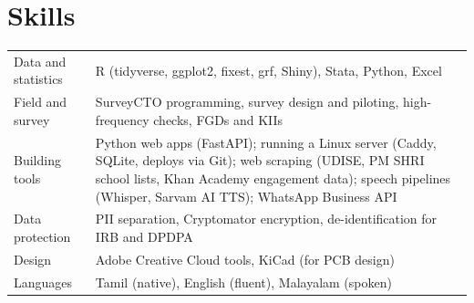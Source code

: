 \documentclass[11pt,a4paper]{article}
\begin{document}
\section{Skills}
\begin{tabular}{@{}>{\raggedright}p{3.1cm}p{13.2cm}@{}}
Data and statistics & R (tidyverse, ggplot2, fixest, grf, Shiny), Stata, Python, Excel \\
Field and survey & SurveyCTO programming, survey design and piloting, high-frequency checks, FGDs and KIIs \\
Building tools & Python web apps (FastAPI); running a Linux server (Caddy, SQLite, deploys via Git); web scraping (UDISE, PM SHRI school lists, Khan Academy engagement data); speech pipelines (Whisper, Sarvam AI TTS); WhatsApp Business API \\
Data protection & PII separation, Cryptomator encryption, de-identification for IRB and DPDPA \\
Design & Adobe Creative Cloud tools, KiCad (for PCB design)  \\
Languages & Tamil (native), English (fluent), Malayalam (spoken) \\
\end{tabular}
\end{document}
